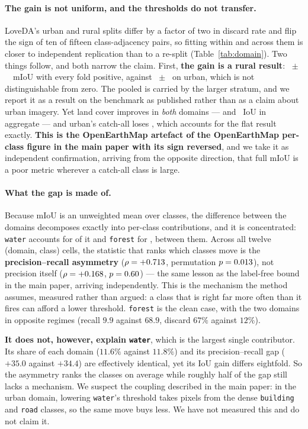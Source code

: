 \documentclass[10pt,a4paper]{article}                        %
\newcommand{\best}[1]{\textbf{#1}}
\begin{document}
\paragraph{The gain is not uniform, and the thresholds do not transfer.}
LoveDA's urban and rural splits differ by a factor of two in discard rate and
flip the sign of ten of fifteen class-adjacency pairs, so fitting within and
across them is closer to independent replication than to a re-split
(Table~\ref{tab:domain}). Two things follow, and both narrow the claim.
First, \best{the gain is a rural result}: \DOMr{}~$\pm$~\DOMrsd{}~mIoU with every
fold positive, against \DOMu{}~$\pm$~\DOMusd{} on urban, which is not
distinguishable from zero. The pooled \methodGain{} is carried by the larger
stratum, and we report it as a result on the benchmark as published rather than
as a claim about urban imagery. Yet land cover improves in \emph{both} domains
--- \DOMrreal{} and \DOMureal{}~IoU in aggregate --- and urban's catch-all loses
\DOMubg{}, which accounts for the flat result exactly. \best{This is the
OpenEarthMap artefact of the OpenEarthMap per-class figure in the main paper with its sign reversed}, and
we take it as independent confirmation, arriving from the opposite direction,
that full mIoU is a poor metric wherever a catch-all class is large.

\paragraph{What the gap is made of.} Because mIoU is an unweighted mean over
classes, the difference between the domains decomposes exactly into per-class
contributions, and it is concentrated: \texttt{water} accounts for \cpWater{} of
it and \texttt{forest} for \cpForest{}, \cpTop{} between them. Across all twelve
(domain, class) cells, the statistic that ranks which classes move is the
\best{precision--recall asymmetry} ($\rho=+0.713{}$, permutation
$p=0.013{}$), not precision itself ($\rho=+0.168{}$, $p=0.60{}$) --- the
same lesson as the label-free bound in the main paper, arriving independently. This is the
mechanism the method assumes, measured rather than argued: a class that is right
far more often than it fires can afford a lower threshold. \texttt{forest} is the
clean case, with the two domains in opposite regimes (recall $9.9$ against
$68.9$, discard $67\%$ against $12\%$).

\best{It does not, however, explain \texttt{water}}, which is the largest single
contributor. Its share of each domain ($11.6\%$ against $11.8\%$) and its
precision--recall gap ($+35.0$ against $+34.4$) are effectively identical, yet its
IoU gain differs eightfold. So the asymmetry ranks the classes on average while
roughly half of the gap still lacks a mechanism. We suspect the coupling described in the main paper: in the urban domain, lowering
\texttt{water}'s threshold takes pixels from the dense \texttt{building} and
\texttt{road} classes, so the same move buys less. We have not measured this and
do not claim it.
\end{document}
